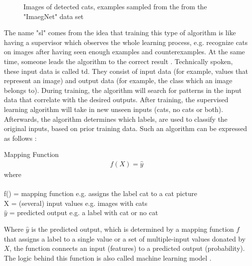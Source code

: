 \begin{figure}[htp]
	\caption{Images of detected cats, examples sampled from the from the "ImaegNet" data set\cite{Building13:online}}
	\label{fig:06_example_dog_vs_cat_dataset}
\end{figure}

The name "\Gls{sl}" comes from the idea that training this type of algorithm is like having a supervisor which observes the whole learning process, e.g. recognize cats on images after having seen enough examples and counterexamples. At the same time, someone leads the algorithm to the correct result \cite[p. 103]{Goodfellow-et-al-2016} \cite[p. 3]{Murphy2012}. Technically spoken, these input data is called \gls{td}. They consist of input data (for example, values that represent an image) and output data (for example, the class which an image belongs to). During training, the algorithm will search for patterns in the input data that correlate with the desired outputs. After training, the supervised learning algorithm will take in new unseen inputs (cats, no cats or both). Afterwards, the algorithm determines which labels, are used to classify the original inputs, based on prior training data. Such an algorithm can be expressed as follows \cite[p. 3]{Murphy2012}:

\begin{definition}[label=def:mapping_function]{Mapping Function}
	\begin{align*}
	f(X) = \hat{y}
	\end{align*}
	where \\\\
	f() = mapping function e.g. assigns the label cat to a cat picture\\
	X   =  (several) input values e.g. images with cats\\
	\( \hat{y}\) = predicted output e.g. a label with cat or no cat\\
\end{definition}

Where \(\hat{y}\) is the predicted output, which is determined by a mapping function \(f\) that assigns a label to a single value or a set of multiple-input values donated by \(X\), the function connects an input (features) to a predicted output (probability). The logic behind this function is also called machine learning model \cite[p. 3]{Murphy2012}.\\

